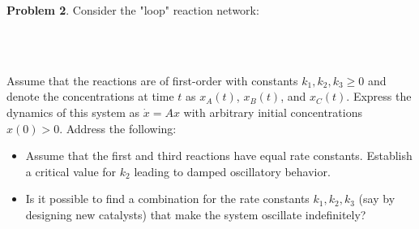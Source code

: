 \documentclass[10pt]{article}
\begin{document}
\noindent\colorbox{mygray}{\begin{minipage}{\textwidth}
  {\bf Problem 2}.  Consider the "loop" reaction network:
    \begin{center}
    \\
    \\
  \end{center}
 Assume that the reactions are of first-order with constants $k_1,k_2,k_3\geq 0$ and denote the concentrations  at time $t$ as $x_A(t)$, $x_B(t)$, and $x_C(t)$. Express the dynamics of this system as $\dot{x}=Ax$ with arbitrary initial concentrations  $x(0)>0$. Address the following:
  \begin{itemize}
  \item Assume that the first and third reactions have equal rate constants. Establish a critical value for $k_2$ leading to damped oscillatory behavior.  
  \item Is it possible to find a combination for the rate constants $k_1,k_2,k_3$ (say by designing new catalysts) that make the system oscillate indefinitely? 
   \end{itemize}
  
  \end{minipage}}
\\
\end{document}
